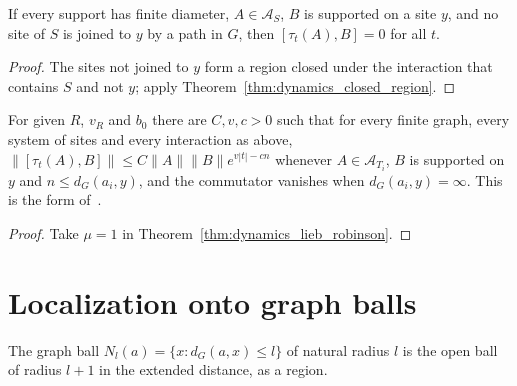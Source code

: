 \begin{theorem}
    \label{thm:dynamics_infinite_distance}
    \leanok
    If every support has finite diameter, $A\in\mathcal A_S$, $B$ is supported
    on a site $y$, and no site of $S$ is joined to $y$ by a path in $G$, then
    $[\tau_t(A),B]=0$ for all $t$.
\end{theorem}
\begin{proof}\leanok
    The sites not joined to $y$ form a region closed under the interaction that
    contains $S$ and not $y$; apply Theorem~\ref{thm:dynamics_closed_region}.
\end{proof}

\begin{corollary}
    \label{cor:dynamics_lieb_robinson_constants}
    \leanok
    For given $R$, $v_R$ and $b_0$ there are $C,v,c>0$ such that for every
    finite graph, every system of sites and every interaction as above,
    $\lVert[\tau_t(A),B]\rVert\leq C\lVert A\rVert\lVert B\rVert e^{v|t|-cn}$
    whenever $A\in\mathcal A_{T_i}$, $B$ is supported on $y$ and
    $n\leq d_G(a_i,y)$, and the commutator vanishes when $d_G(a_i,y)=\infty$.
    This is the form of~\cite[Lemma~4.1]{OpenAI2026AreaLaw}.
\end{corollary}
\begin{proof}\leanok
    Take $\mu=1$ in Theorem~\ref{thm:dynamics_lieb_robinson}.
\end{proof}

\section{Localization onto graph balls}
\label{sec:dynamics_localization}

\begin{definition}
    \label{def:dynamics_graph_ball}
    \leanok
    The graph ball $N_l(a)=\{x:d_G(a,x)\leq l\}$ of natural radius $l$ is the
    open ball of radius $l+1$ in the extended distance, as a region.
\end{definition}

